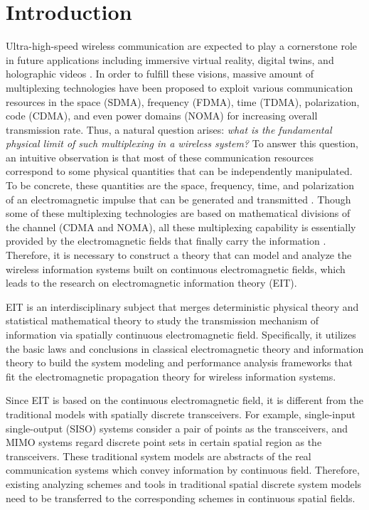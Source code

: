 \documentclass[journal,twocolumn]{IEEEtran}
\begin{document}
\section{Introduction}
Ultra-high-speed wireless communication are expected to play a cornerstone role in future applications including immersive virtual reality, digital twins, and holographic videos \cite{saad2019vision}. 
In order to fulfill these visions, massive amount of multiplexing technologies have been proposed to exploit various communication resources in the space (SDMA), frequency (FDMA), time (TDMA), polarization, code (CDMA), and even power domains (NOMA) for increasing overall transmission rate. 
Thus, a natural question arises: {\it what is the fundamental physical limit of such multiplexing in a wireless system?}
To answer this question, an intuitive observation is that most of these communication resources correspond to some physical quantities that can be independently manipulated. To be concrete, these quantities are the space, frequency, time, and polarization of an electromagnetic impulse that can be generated and transmitted \cite{shah2022survey}. Though some of these multiplexing technologies are based on mathematical divisions of the channel (CDMA and NOMA), all these multiplexing capability is essentially provided by the electromagnetic fields that finally carry the information \cite{gruber2008new}. Therefore, it is necessary to construct a theory that can model and analyze the wireless information systems built on continuous electromagnetic fields, which leads to the research on electromagnetic information theory (EIT).

EIT is an interdisciplinary subject that merges deterministic physical theory and statistical mathematical theory to study the transmission mechanism of information via spatially continuous electromagnetic field. 
Specifically, it utilizes the basic laws and conclusions in classical electromagnetic theory and information theory to build the system modeling and performance analysis frameworks that fit the electromagnetic propagation theory for wireless information systems. 

Since EIT is based on the continuous electromagnetic field, it is different from the traditional models with spatially discrete transceivers. 
For example, single-input single-output (SISO) systems consider a pair of points as the transceivers, and MIMO systems regard discrete point sets in certain spatial region as the transceivers. These traditional system models are abstracts of the real communication systems which convey information by continuous field. Therefore, existing analyzing schemes and tools in traditional spatial discrete system models need to be transferred to the corresponding schemes in continuous spatial fields. 
\end{document}
